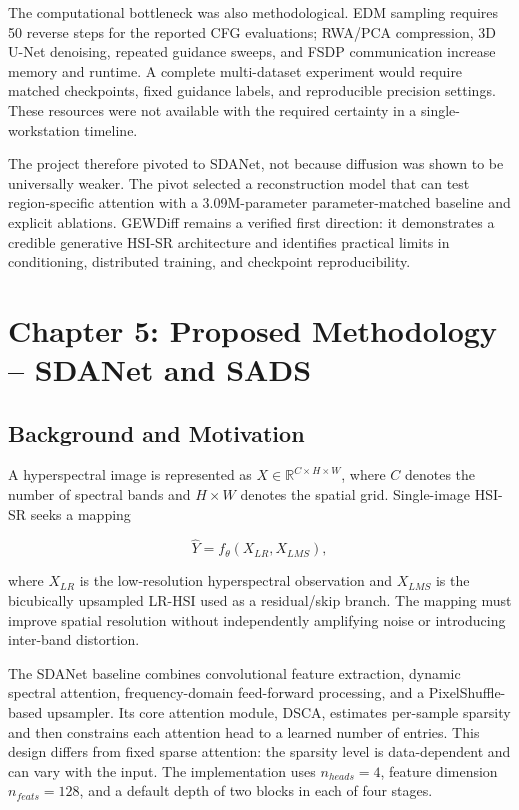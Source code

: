 \documentclass[10pt,twocolumn,letterpaper]{article}
\begin{document}
The computational bottleneck was also methodological. EDM sampling requires 50 reverse steps for the reported CFG evaluations; RWA/PCA compression, 3D U-Net denoising, repeated guidance sweeps, and FSDP communication increase memory and runtime. A complete multi-dataset experiment would require matched checkpoints, fixed guidance labels, and reproducible precision settings. These resources were not available with the required certainty in a single-workstation timeline.

The project therefore pivoted to SDANet, not because diffusion was shown to be universally weaker. The pivot selected a reconstruction model that can test region-specific attention with a 3.09M-parameter parameter-matched baseline and explicit ablations. GEWDiff remains a verified first direction: it demonstrates a credible generative HSI-SR architecture and identifies practical limits in conditioning, distributed training, and checkpoint reproducibility.

\section{Chapter 5: Proposed Methodology -- SDANet and SADS}
\label{sec:sads-method}

\subsection{Background and Motivation}

A hyperspectral image is represented as
$X \in \mathbb{R}^{C\times H\times W}$, where $C$ denotes the number of spectral bands and $H\times W$ denotes the spatial grid. Single-image HSI-SR seeks a mapping

\begin{equation}
    \hat{Y} = f_{\theta}(X_{LR}, X_{LMS}),
\end{equation}

where $X_{LR}$ is the low-resolution hyperspectral observation and $X_{LMS}$ is the bicubically upsampled LR-HSI used as a residual/skip branch. The mapping must improve spatial resolution without independently amplifying noise or introducing inter-band distortion.

The SDANet baseline combines convolutional feature extraction, dynamic spectral attention, frequency-domain feed-forward processing, and a PixelShuffle-based upsampler. Its core attention module, DSCA, estimates per-sample sparsity and then constrains each attention head to a learned number of entries. This design differs from fixed sparse attention: the sparsity level is data-dependent and can vary with the input. The implementation uses $n_{heads}=4$, feature dimension $n_{feats}=128$, and a default depth of two blocks in each of four stages.
\end{document}
